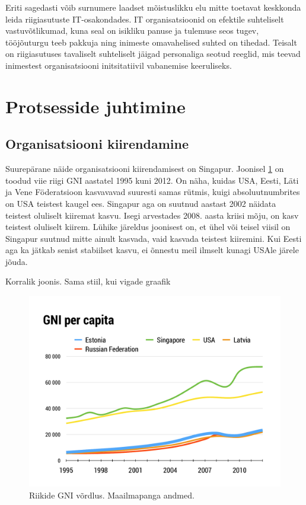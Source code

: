 Eriti sagedasti võib surnumere laadset mõistuslikku elu mitte toetavat keskkonda leida riigiasutuste IT-osakondades. IT organisatsioonid on efektile suhteliselt vastuvõtlikumad, kuna seal on isikliku panuse ja tulemuse seos tugev, tööjõuturgu teeb pakkuja ning inimeste omavahelised suhted on tihedad. Teisalt on riigiasutuses tavaliselt suhteliselt jäigad personaliga seotud reeglid, mis teevad inimestest organisatsiooni initsitatiivil vabanemise keeruliseks. 

\section{Protsesside juhtimine}
\subsection{Organisatsiooni kiirendamine}
Suurepärane näide organisatsiooni kiirendamisest on Singapur. Joonisel \ref{fig:kasv} on toodud viie riigi GNI aastatel 1995 kuni 2012. On näha, kuidas USA, Eesti, Läti ja Vene Föderatsioon kasvavavad suuresti samas rütmis, kuigi absoluutnumbrites on USA teistest kaugel ees. Singapur aga on suutnud aastast 2002 näidata teistest oluliselt kiiremat kasvu. Isegi arvestades 2008. aasta kriisi mõju, on kasv teistest oluliselt kiirem. Lühike järeldus joonisest on, et ühel või teisel viisil on Singapur suutnud mitte ainult kasvada, vaid kasvada teistest kiiremini. Kui Eesti aga ka jätkab senist stabiilset kasvu, ei õnnestu meil ilmselt kunagi USAle järele jõuda. 

\TODO Korralik joonis. Sama stiil, kui vigade graafik

\begin{figure}[h]
	\begin{center}
		\includegraphics[width=\textwidth]{kasv.pdf}
		\caption{Riikide GNI võrdlus. Maailmapanga andmed.}
		\label{fig:kasv}
	\end{center}
\end{figure}

